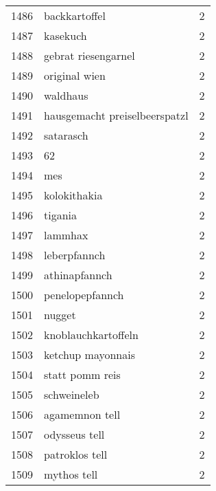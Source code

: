 \begin{tabular}{llr}
1486 &                                      backkartoffel &      2 \\
1487 &                                           kasekuch &      2 \\
1488 &                                gebrat riesengarnel &      2 \\
1489 &                                      original wien &      2 \\
1490 &                                           waldhaus &      2 \\
1491 &                      hausgemacht preiselbeerspatzl &      2 \\
1492 &                                          satarasch &      2 \\
1493 &                                                 62 &      2 \\
1494 &                                                mes &      2 \\
1495 &                                       kolokithakia &      2 \\
1496 &                                            tigania &      2 \\
1497 &                                            lammhax &      2 \\
1498 &                                       leberpfannch &      2 \\
1499 &                                      athinapfannch &      2 \\
1500 &                                    penelopepfannch &      2 \\
1501 &                                             nugget &      2 \\
1502 &                                knoblauchkartoffeln &      2 \\
1503 &                                  ketchup mayonnais &      2 \\
1504 &                                    statt pomm reis &      2 \\
1505 &                                        schweineleb &      2 \\
1506 &                                     agamemnon tell &      2 \\
1507 &                                      odysseus tell &      2 \\
1508 &                                     patroklos tell &      2 \\
1509 &                                        mythos tell &      2 \\

\end{tabular}
